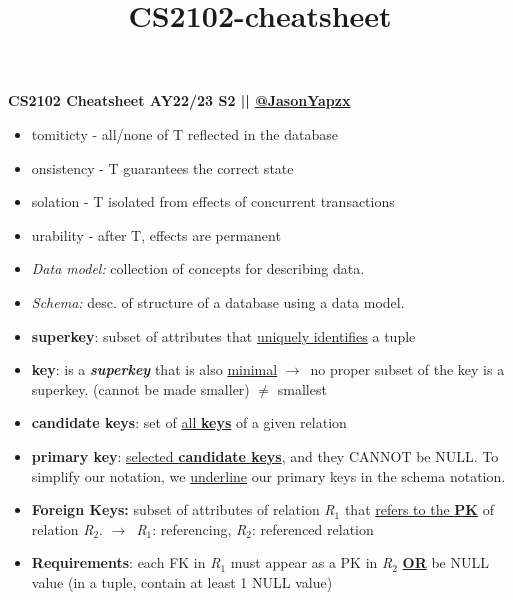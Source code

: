 \documentclass[10pt,landscape]{article}
\title{CS2102-cheatsheet}
\begin{document}
\raggedright
\footnotesize


\begin{multicols*}{3}
    \begin{tiny}
        \small{\textbf{CS2102 Cheatsheet AY22/23 S2 || \href{https://github.com/JasonYapzx}{@JasonYapzx}}} \\
   \end{tiny}
\setlength{\premulticols}{0.5pt}
\setlength{\postmulticols}{0.5pt}
\setlength{\multicolsep}{0.5pt}
\setlength{\columnsep}{0.5pt}

\begin{itemize}[topsep=0pt,noitemsep,wide=0pt, leftmargin=\dimexpr{} + 2\relax]
    \item {}tomiticty - all/none of T reflected in the database
    \item {}onsistency - T guarantees the correct state 
    \item {}solation - T isolated from effects of concurrent transactions
    \item {}urability - after T, effects are permanent
    \item \textit{Data model:} collection of concepts for describing data.
    \item \textit{Schema:} desc. of structure of a database using a data model.
    \item \textbf{superkey}: subset of attributes that \underline{uniquely identifies} a tuple
    \item \textbf{key}: is a \textbf{\textit{superkey}} that is also \underline{minimal} $\rightarrow$\ no proper subset of the key is a superkey. (cannot be made smaller) $\neq$ smallest
    \item \textbf{candidate keys}: set of \underline{all \textbf{keys}} of a given relation
    \item \textbf{primary key}: \underline{selected \textbf{candidate keys}}, and they CANNOT be NULL. To simplify our notation, we \underline{underline} our primary keys in the schema notation.
    \item \textbf{Foreign Keys:} subset of attributes of relation \textit{R$_1$} that \underline{refers to the \textbf{PK}} of relation \textit{R$_2$}.
    \footnotesize {$\rightarrow$\ \textit{R$_1$}: referencing, \textit{R$_2$}: referenced relation}
    \item \textbf{Requirements}: each FK in \textit{R$_1$} must appear as a PK in \textit{R$_2$} \underline{\textbf{OR}} be NULL value (in a tuple, contain at least 1 NULL value)
\end{itemize}


\end{multicols*}
\end{document}
